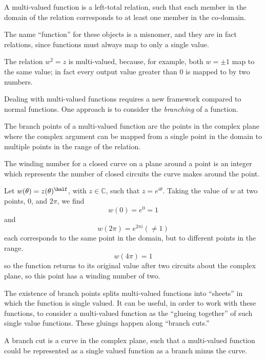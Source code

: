 \begin{definition}
  A multi-valued function is a left-total relation, such that each
  member in the domain of the relation corresponds to at least one
  member in the co-domain.
\end{definition}
The name ``function'' for these objects is a misnomer, and they are in
fact relations, since functions must always map to only a single
value.
\begin{example}
  The relation $w^2 = z$ is multi-valued, because, for example, both
  $w=\pm 1$ map to the same value; in fact every output value greater
  than 0 is mapped to by two numbers.
\end{example}
Dealing with multi-valued functions requires a new framework compared
to normal functions. One approach is to consider the \emph{branching}
of a function.
\begin{definition}
  The branch points of a multi-valued function are the points in the
  complex plane where the complex argument can be mapped from a single
  point in the domain to multiple points in the range of the relation.
\end{definition}
\begin{definition}
  The winding number for a closed curve on a plane around a point is
  an integer which represents the number of closed circuits the curve
  makes around the point.
\end{definition}
\begin{example}
  Let $w(\theta) = z(\theta)^{\half}$, with $z \in \mathbb{C}$, such
  that $z = e^{i \theta}$. Taking the value of $w$ at two points, $0$,
  and $2 \pi$, we find
  \[ w(0) = e^0 = 1 \] and \[ w(2\pi) = e^{2 \pi i} ( \neq 1) \] each
  corresponds to the same point in the domain, but to different points
  in the range.
  \[ w(4 \pi) = 1 \] so the function returns to its original value
  after two circuits about the complex plane, so this point has a
  winding number of two.
\end{example}
The existence of branch points splits multi-valued functions into
``sheets'' in which the function is single valued. It can be useful,
in order to work with these functions, to consider a multi-valued
function as the ``glueing together'' of such single value
functions. These gluings happen along ``branch cuts.''
\begin{definition}
  A branch cut is a curve in the complex plane, such that a
  multi-valued function could be represented as a single valued
  function as a branch minus the curve.
\end{definition}
